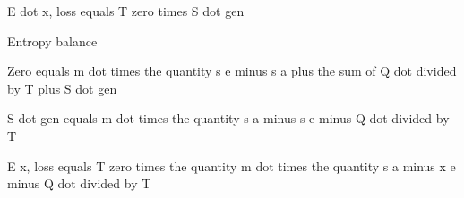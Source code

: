 E dot x, loss equals T zero times S dot gen

Entropy balance

Zero equals m dot times the quantity s e minus s a plus the sum of Q dot divided by T plus S dot gen

S dot gen equals m dot times the quantity s a minus s e minus Q dot divided by T

E x, loss equals T zero times the quantity m dot times the quantity s a minus x e minus Q dot divided by T